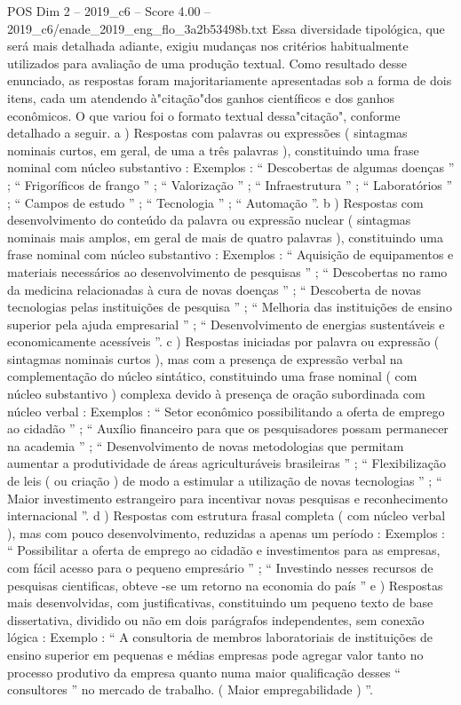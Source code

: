 \begin{textsample}{POS Dim 2 – 2019\_c6 – Score 4.00 – 2019\_c6/enade\_2019\_eng\_flo\_3a2b53498b.txt}
Essa diversidade tipológica, que será mais detalhada adiante, exigiu mudanças nos critérios habitualmente utilizados para avaliação de uma produção textual.
Como resultado desse enunciado, as respostas foram majoritariamente apresentadas sob a forma de dois itens, cada um atendendo à"citação"dos ganhos científicos e dos ganhos econômicos.
O que variou foi o formato textual dessa"citação", conforme detalhado a seguir. a ) Respostas com palavras ou expressões ( sintagmas nominais curtos, em geral, de uma a três palavras ), constituindo uma frase nominal com núcleo substantivo : Exemplos : “ Descobertas de algumas doenças ” ; “ Frigoríficos de frango ” ; “ Valorização ” ; “ Infraestrutura ” ; “ Laboratórios ” ; “ Campos de estudo ” ; “ Tecnologia ” ; “ Automação ”. b ) Respostas com desenvolvimento do conteúdo da palavra ou expressão nuclear ( sintagmas nominais mais amplos, em geral de mais de quatro palavras ), constituindo uma frase nominal com núcleo substantivo : Exemplos : “ Aquisição de equipamentos e materiais necessários ao desenvolvimento de pesquisas ” ; “ Descobertas no ramo da medicina relacionadas à cura de novas doenças ” ; “ Descoberta de novas tecnologias pelas instituições de pesquisa ” ; “ Melhoria das instituições de ensino superior pela ajuda empresarial ” ; “ Desenvolvimento de energias sustentáveis e economicamente acessíveis ”. c ) Respostas iniciadas por palavra ou expressão ( sintagmas nominais curtos ), mas com a presença de expressão verbal na complementação do núcleo sintático, constituindo uma frase nominal ( com núcleo substantivo ) complexa devido à presença de oração subordinada com núcleo verbal : Exemplos : “ Setor econômico possibilitando a oferta de emprego ao cidadão ” ; “ Auxílio financeiro para que os pesquisadores possam permanecer na academia ” ; “ Desenvolvimento de novas metodologias que permitam aumentar a produtividade de áreas agriculturáveis brasileiras ” ; “ Flexibilização de leis ( ou criação ) de modo a estimular a utilização de novas tecnologias ” ; “ Maior investimento estrangeiro para incentivar novas pesquisas e reconhecimento internacional ”. d ) Respostas com estrutura frasal completa ( com núcleo verbal ), mas com pouco desenvolvimento, reduzidas a apenas um período : Exemplos : “ Possibilitar a oferta de emprego ao cidadão e investimentos para as empresas, com fácil acesso para o pequeno empresário ” ; “ Investindo nesses recursos de pesquisas cientificas, obteve -se um retorno na economia do país ” e ) Respostas mais desenvolvidas, com justificativas, constituindo um pequeno texto de base dissertativa, dividido ou não em dois parágrafos independentes, sem conexão lógica : Exemplo : “ A consultoria de membros laboratoriais de instituições de ensino superior em pequenas e médias empresas pode agregar valor tanto no processo produtivo da empresa quanto numa maior qualificação desses “ consultores ” no mercado de trabalho. ( Maior empregabilidade ) ”.

\end{textsample}
